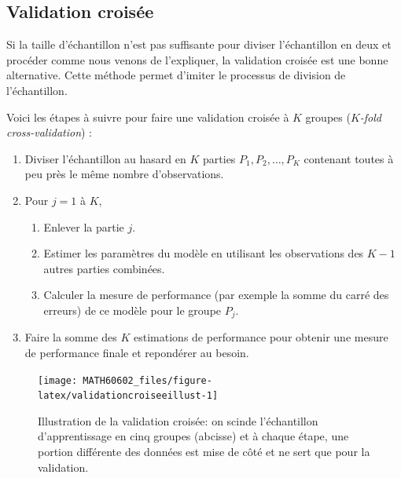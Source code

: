 \documentclass[
  11pt,
  letterpaper,
]{book}
\providecommand{\tightlist}{%
  \setlength{\itemsep}{0pt}\setlength{\parskip}{0pt}}
\theoremstyle{definition}
\theoremstyle{definition}
\theoremstyle{definition}
\theoremstyle{definition}
\theoremstyle{remark}
\begin{document}
\hypertarget{validation-croisuxe9e}{%
\subsection{Validation croisée}\label{validation-croisuxe9e}}

Si la taille d'échantillon n'est pas suffisante pour diviser l'échantillon en deux et procéder comme nous venons de l'expliquer, la validation croisée est une bonne alternative. Cette méthode permet d'imiter le processus de division de l'échantillon.

Voici les étapes à suivre pour faire une validation croisée à \(K\) groupes (\emph{\(K\)-fold cross-validation}) :

\begin{enumerate}
\def\labelenumi{\arabic{enumi}.}
\tightlist
\item
  Diviser l'échantillon au hasard en \(K\) parties \(P_1, P_2, \ldots, P_K\) contenant toutes à peu près le même nombre d'observations.
\item
  Pour \(j = 1\) à \(K\),

  \begin{enumerate}
  \def\labelenumii{\roman{enumii}.}
  \tightlist
  \item
    Enlever la partie \(j\).
  \item
    Estimer les paramètres du modèle en utilisant les observations des \(K-1\) autres parties combinées.
  \item
    Calculer la mesure de performance (par exemple la somme du carré des erreurs) de ce modèle pour le groupe \(P_j\).
  \end{enumerate}
\item
  Faire la somme des \(K\) estimations de performance pour obtenir une mesure de performance finale et repondérer au besoin.
\end{enumerate}

\begin{figure}

{\centering \texttt{[image: MATH60602\_files/figure-latex/validationcroiseeillust-1]} 

}

\caption{Illustration de la validation croisée: on scinde l'échantillon d'apprentissage en cinq groupes (abcisse) et à chaque étape, une portion différente des données est mise de côté et ne sert que pour la validation.}\label{fig:validationcroiseeillust}
\end{figure}
\end{document}
